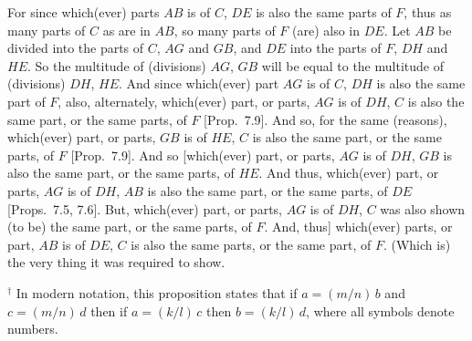 \begin{Parallel}{}{}
{\epsfysize=2in
\centerline{}

For since which(ever) parts $AB$ is of $C$, $DE$ is also the same parts of $F$,
thus as many parts of $C$ as are in $AB$, so many parts of $F$ (are)
also in $DE$. Let $AB$ be divided into the parts of $C$, $AG$ and $GB$, and
$DE$ into the parts of $F$, $DH$ and $HE$.  So the multitude of
(divisions) $AG$, $GB$ will be equal to the multitude of (divisions) $DH$, $HE$.
And since which(ever) part $AG$ is of $C$, $DH$ is also the same part of $F$,
also, alternately, which(ever) part, or parts, $AG$ is
of $DH$, $C$ is also the same part, or the same parts, of $F$  [Prop.~7.9]. And so, for the same (reasons), 
which(ever) part, or parts, $GB$ is of $HE$, $C$ is also the same
part, or the same parts, of $F$ [Prop.~7.9]. And so [which(ever) part, or parts, $AG$ is of
$DH$, $GB$ is also the same part, or the same parts, of $HE$. And thus,
which(ever) part, or parts, $AG$ is of $DH$, $AB$ is also the same part, or the
same parts, of $DE$ [Props.~7.5, 7.6]. But, which(ever) part, or parts, $AG$ is of $DH$, $C$ was also
shown (to be) the same part, or the same parts, of $F$. And, thus] which(ever)
parts, or part, $AB$ is of $DE$, $C$ is also the  same parts, or the same part, of $F$. (Which
is) the very thing it was required to show.}
\end{Parallel}
{\footnotesize\noindent$^\dag$ In modern notation, this
proposition states that if $a=(m/n)\,b$ and $c=(m/n)\,d$ then if $a=(k/l)\,c$
then $b = (k/l)\,d$, where all symbols denote numbers.}

